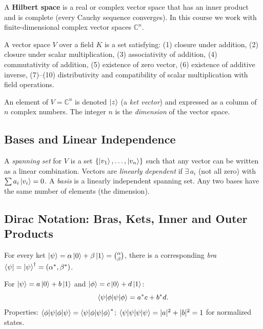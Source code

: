 \documentclass[10pt,a4paper]{article}
\begin{document}
\begin{tcolorbox}[defstyle, title={Definition: Hilbert Space}]
A \textbf{Hilbert space} is a real or complex vector space that has an inner product and is complete (every Cauchy sequence converges). In this course we work with finite-dimensional complex vector spaces $\mathbb{C}^n$.
\end{tcolorbox}

\begin{tcolorbox}[defstyle, title={Definition: Vector Space}]
A vector space $V$ over a field $K$ is a set satisfying: (1) closure under addition, (2) closure under scalar multiplication, (3) associativity of addition, (4) commutativity of addition, (5) existence of zero vector, (6) existence of additive inverse, (7)--(10) distributivity and compatibility of scalar multiplication with field operations.
\end{tcolorbox}

An element of $V=\mathbb{C}^n$ is denoted $\ket{z}$ (a \emph{ket vector}) and expressed as a column of $n$ complex numbers. The integer $n$ is the \emph{dimension} of the vector space.

\subsection{Bases and Linear Independence}

A \emph{spanning set} for $V$ is a set $\{\ket{v_1},\dots,\ket{v_n}\}$ such that any vector can be written as a linear combination. Vectors are \emph{linearly dependent} if $\exists\, a_i$ (not all zero) with $\sum a_i\ket{v_i}=0$. A \emph{basis} is a linearly independent spanning set. Any two bases have the same number of elements (the dimension).

\subsection{Dirac Notation: Bras, Kets, Inner and Outer Products}

For every ket $\ket{\psi}=\alpha\ket{0}+\beta\ket{1}=\binom{\alpha}{\beta}$, there is a corresponding \emph{bra} $\bra{\psi}=\ket{\psi}^\dagger=(\alpha^*,\beta^*)$.

\begin{tcolorbox}[defstyle, title={Definition: Inner Product}]
For $\ket{\psi}=a\ket{0}+b\ket{1}$ and $\ket{\phi}=c\ket{0}+d\ket{1}$:
\[
\braket{\psi|\phi} = a^*c + b^*d.
\]
Properties: $\braket{\phi|\psi}=\braket{\psi|\phi}^*$; $\braket{\psi|\psi}=|a|^2+|b|^2=1$ for normalized states.
\end{tcolorbox}
\end{document}
